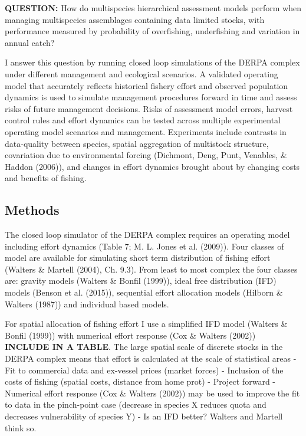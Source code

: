 \documentclass[12pt,]{scrartcl}
\begin{document}
\textbf{QUESTION:} How do multispecies hierarchical assessment models
perform when managing multispecies assemblages containing data limited
stocks, with performance measured by probability of overfishing,
underfishing and variation in annual catch?

I answer this question by running closed loop simulations of the DERPA
complex under different management and ecological scenarios. A validated
operating model that accurately reflects historical fishery effort and
observed population dynamics is used to simulate management procedures
forward in time and assess risks of future management decisions. Risks
of assessment model errors, harvest control rules and effort dynamics
can be tested across multiple experimental operating model scenarios and
management. Experiments include contrasts in data-quality between
species, spatial aggregation of multistock structure, covariation due to
environmental forcing (Dichmont, Deng, Punt, Venables, \& Haddon
(2006)), and changes in effort dynamics brought about by changing costs
and benefits of fishing.

\subsection{Methods}\label{methods-2}

The closed loop simulator of the DERPA complex requires an operating
model including effort dynamics (Table 7; M. L. Jones et al. (2009)).
Four classes of model are available for simulating short term
distribution of fishing effort (Walters \& Martell (2004), Ch. 9.3).
From least to most complex the four classes are: gravity models (Walters
\& Bonfil (1999)), ideal free distribution (IFD) models (Benson et al.
(2015)), sequential effort allocation models (Hilborn \& Walters (1987))
and individual based models.

For spatial allocation of fishing effort I use a simplified IFD model
(Walters \& Bonfil (1999)) with numerical effort response (Cox \&
Walters (2002)) \textbf{INCLUDE IN A TABLE}. The large spatial scale of
discrete stocks in the DERPA complex means that effort is calculated at
the scale of statistical areas - Fit to commercial data and ex-vessel
prices (market forces) - Inclusion of the costs of fishing (spatial
costs, distance from home prot) - Project forward - Numerical effort
response (Cox \& Walters (2002)) may be used to improve the fit to data
in the pinch-point case (decrease in species X reduces quota and
decreases vulnerability of species Y) - Is an IFD better? Walters and
Martell think so.
\end{document}
